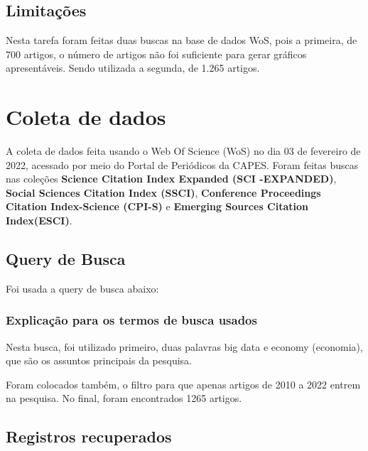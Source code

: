 \subsection{Limitações} 

Nesta tarefa foram feitas duas buscas na base de dados WoS, pois a primeira, de 700 artigos, o número de artigos não foi suficiente para gerar gráficos apresentáveis. Sendo utilizada a segunda, de 1.265 artigos.


\section{Coleta de dados}

A coleta de dados feita usando o Web Of Science (WoS) no dia 03 de fevereiro de 2022, acessado por meio do Portal de Periódicos da CAPES. Foram feitas buscas nas coleções \textbf{Science  Citation  Index  Expanded (SCI -EXPANDED)}, \textbf{Social Sciences  Citation  Index (SSCI)}, \textbf{Conference Proceedings Citation Index-Science (CPI-S)} e \textbf{Emerging Sources Citation Index(ESCI)}. 

\subsection{Query de Busca}

Foi usada a query de busca abaixo: 






\subsubsection{Explicação para os termos de busca usados}

Nesta busca, foi utilizado primeiro, duas palavras big data e economy (economia), que são os assuntos principais da pesquisa.%

Foram colocados também, o filtro para que apenas artigos de 2010 a 2022 entrem na pesquisa. No final, foram encontrados 1265 artigos.

\subsection{Registros recuperados}

